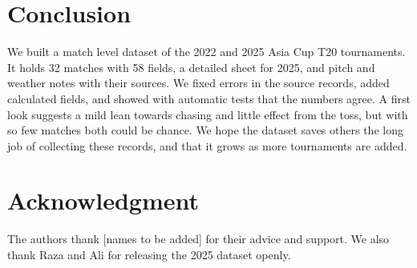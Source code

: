 \section{Conclusion}
We built a match level dataset of the 2022 and 2025 Asia Cup T20 tournaments. It holds 32 matches with 58 fields, a detailed sheet for 2025, and pitch and weather notes with their sources. We fixed errors in the source records, added calculated fields, and showed with automatic tests that the numbers agree. A first look suggests a mild lean towards chasing and little effect from the toss, but with so few matches both could be chance. We hope the dataset saves others the long job of collecting these records, and that it grows as more tournaments are added.

\section*{Acknowledgment}
The authors thank [names to be added] for their advice and support. We also thank Raza and Ali for releasing the 2025 dataset openly.
